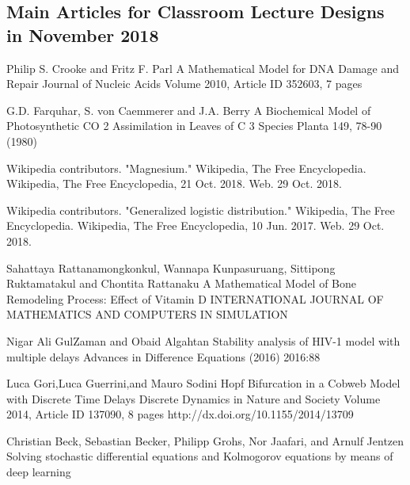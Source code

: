 

\begin{thebibliography}{00}
\small

\section{Main Articles for Classroom Lecture Designs in November 2018}
 
Philip S. Crooke and Fritz F. Parl
\newblock A Mathematical Model for DNA Damage and Repair
\newblock Journal of Nucleic Acids Volume 2010, Article ID 352603, 7 pages

 G.D. Farquhar, S. von Caemmerer and J.A. Berry  
\newblock A Biochemical Model of Photosynthetic CO 2 Assimilation in Leaves of C 3 Species 
\newblock Planta 149, 78-90 (1980) 

 Wikipedia contributors. 
\newblock "Magnesium." 
\newblock Wikipedia, The Free Encyclopedia. Wikipedia, The Free Encyclopedia, 21 Oct. 2018. Web. 29 Oct. 2018. 

Wikipedia contributors. 
\newblock "Generalized logistic distribution." 
\newblock Wikipedia, The Free Encyclopedia. Wikipedia, The Free Encyclopedia, 10 Jun. 2017. Web. 29 Oct. 2018. 

Sahattaya Rattanamongkonkul,  Wannapa Kunpasuruang, Sittipong Ruktamatakul and Chontita Rattanaku
\newblock A Mathematical Model of Bone Remodeling Process:  Effect of Vitamin D
\newblock INTERNATIONAL JOURNAL OF MATHEMATICS AND COMPUTERS IN SIMULATION

Nigar Ali GulZaman and Obaid Algahtan
\newblock Stability analysis of HIV-1 model with multiple delays
\newblock Advances in Difference Equations (2016) 2016:88 

 Luca Gori,Luca Guerrini,and Mauro Sodini
\newblock Hopf Bifurcation in a Cobweb Model with Discrete Time Delays
\newblock Discrete Dynamics in Nature and Society Volume 2014, Article ID 137090, 8 pages http://dx.doi.org/10.1155/2014/13709

 Christian Beck, Sebastian Becker, Philipp Grohs, Nor Jaafari, and Arnulf Jentzen
\newblock Solving stochastic differential equations and Kolmogorov equations by means of deep learning


\end{thebibliography}

